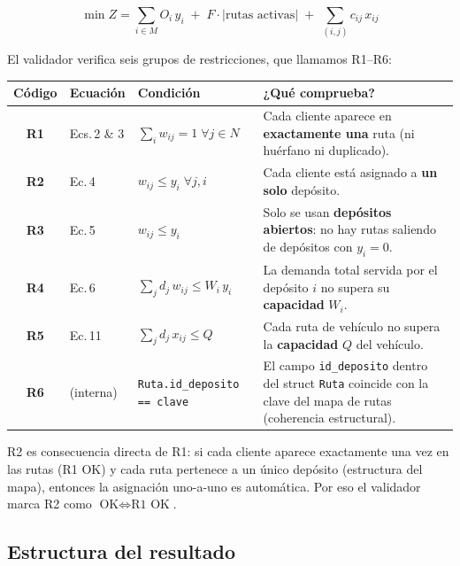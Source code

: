 \documentclass[12pt,a4paper]{article}
\begin{document}
\begin{equation}
\min Z = \sum_{i \in M} O_i \, y_i \;+\; F \cdot |\text{rutas activas}| \;+\; \sum_{(i,j)} c_{ij} \, x_{ij}
\tag{Ec.\,1}
\end{equation}

El validador verifica seis grupos de restricciones, que llamamos R1--R6:

\begin{center}
\renewcommand{\arraystretch}{1.4}
\begin{tabular}{>{\bfseries}cllp{5.2cm}}
\toprule
Código & Ecuación & Condición & ¿Qué comprueba? \\
\midrule
R1 & Ecs.\,2 \& 3 & $\sum_i w_{ij} = 1 \;\forall j \in N$ & Cada cliente aparece en \textbf{exactamente una} ruta (ni huérfano ni duplicado). \\
R2 & Ec.\,4       & $w_{ij} \leq y_i \;\forall j,i$       & Cada cliente está asignado a \textbf{un solo} depósito. \\
R3 & Ec.\,5       & $w_{ij} \leq y_i$                     & Solo se usan \textbf{depósitos abiertos}: no hay rutas saliendo de depósitos con $y_i=0$. \\
R4 & Ec.\,6       & $\sum_j d_j \, w_{ij} \leq W_i \, y_i$ & La demanda total servida por el depósito $i$ no supera su \textbf{capacidad} $W_i$. \\
R5 & Ec.\,11      & $\sum_j d_j \, x_{ij} \leq Q$          & Cada ruta de vehículo no supera la \textbf{capacidad} $Q$ del vehículo. \\
R6 & (interna)    & \texttt{Ruta.id\_deposito == clave}    & El campo \texttt{id\_deposito} dentro del struct \texttt{Ruta} coincide con la clave del mapa de rutas (coherencia estructural). \\
\bottomrule
\end{tabular}
\end{center}

\begin{nota}
R2 es consecuencia directa de R1: si cada cliente aparece exactamente una vez en las rutas (R1 OK) y cada ruta pertenece a un único depósito (estructura del mapa), entonces la asignación uno-a-uno es automática. Por eso el validador marca R2 como $\text{OK} \Leftrightarrow \text{R1 OK}$.
\end{nota}

\subsection{Estructura del resultado}
\end{document}
